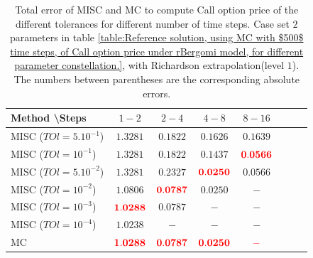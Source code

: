\documentclass[11pt]{article}
\begin{document}
\begin{table}[h!]
	\centering
	\begin{tabular}{l*{6}{c}r}
		Method \textbackslash  Steps            & $1-2$ & $2-4$ & $4-8$ & $8-16$  \\
		\hline
		MISC ($TOl=5.10^{-1}$)  & $\mathbf{  1.3281}$ & $\mathbf{  0.1822}$ & $\mathbf{
		   0.1626
	}$ & $\mathbf{    0.1639
}$ \\
		MISC ($TOl=10^{-1}$)  & $\mathbf{  1.3281}$ & $\mathbf{0.1822}$ & $\mathbf{0.1437}$ &$\mathbf{{\color{red}0.0566}}$  \\
		MISC ($TOl=5.10^{-2}$)  & $\mathbf{  1.3281}$ & $\mathbf{ 0.2327}$ & $\mathbf{  {\color{red}0.0250}}$ & $\mathbf{0.0566}$   \\
		MISC ($TOl=10^{-2}$)  & $\mathbf{   1.0806
		}$ & $\mathbf{    {\color{red}0.0787}}$ & $\mathbf{ 0.0250}$ & $\mathbf{-}$  \\
		MISC ($TOl=10^{-3}$)  & $\mathbf{ {\color{red}  1.0288}}$ & $\mathbf{    0.0787}$ & $\mathbf{-}$ & $\mathbf{-}$  \\
		
		MISC ($TOl=10^{-4}$)  & $\mathbf{     1.0238}$ & $\mathbf{-}$ & $\mathbf{-}$ & $\mathbf{-}$  \\
		\hline
		
		MC &$\mathbf{ {\color{red}  1.0288}}$  & $\mathbf{{\color{red}0.0787}}$ & $\mathbf{{\color{red}0.0250}}$ & $\mathbf{{\color{red}-}}$ \\
	
		\hline
	\end{tabular}
	\caption{Total  error of MISC and MC to compute Call option price of the different tolerances for different number of time steps. Case set $2$ parameters in table \ref{table:Reference solution, using MC with $500$ time steps, of Call option price under rBergomi model, for different parameter constellation.}, with Richardson extrapolation(level $1$). The numbers between parentheses are the corresponding absolute errors.}
	\label{Total  error of MISC and MC to compute Call option price of the different tolerances for different number of time steps. Case set $2$ parameters, with Richardson extrapolation(level $1$). The numbers between parentheses are the corresponding absolute errors,relative}
\end{table}
\end{document}
